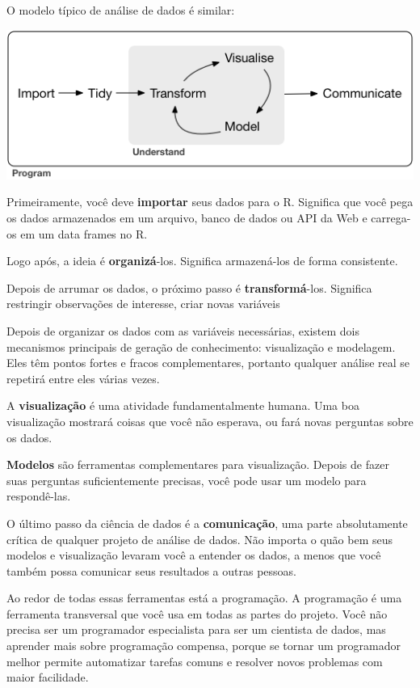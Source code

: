 \documentclass[]{book}
\begin{document}
O modelo típico de análise de dados é similar:

\begin{center}\includegraphics[width=0.75\linewidth]{imagens/data-science} \end{center}

Primeiramente, você deve \textbf{importar} seus dados para o R. Significa que você pega os dados armazenados em um arquivo, banco de dados ou API da Web e carrega-os em um data frames no R.

Logo após, a ideia é \textbf{organizá}-los. Significa armazená-los de forma consistente.

Depois de arrumar os dados, o próximo passo é \textbf{transformá}-los. Significa restringir observações de interesse, criar novas variáveis

Depois de organizar os dados com as variáveis necessárias, existem dois mecanismos principais de geração de conhecimento: visualização e modelagem. Eles têm pontos fortes e fracos complementares, portanto qualquer análise real se repetirá entre eles várias vezes.

A \textbf{visualização} é uma atividade fundamentalmente humana. Uma boa visualização mostrará coisas que você não esperava, ou fará novas perguntas sobre os dados.

\textbf{Modelos} são ferramentas complementares para visualização. Depois de fazer suas perguntas suficientemente precisas, você pode usar um modelo para respondê-las.

O último passo da ciência de dados é a \textbf{comunicação}, uma parte absolutamente crítica de qualquer projeto de análise de dados. Não importa o quão bem seus modelos e visualização levaram você a entender os dados, a menos que você também possa comunicar seus resultados a outras pessoas.

Ao redor de todas essas ferramentas está a programação. A programação é uma ferramenta transversal que você usa em todas as partes do projeto. Você não precisa ser um programador especialista para ser um cientista de dados, mas aprender mais sobre programação compensa, porque se tornar um programador melhor permite automatizar tarefas comuns e resolver novos problemas com maior facilidade.
\end{document}

